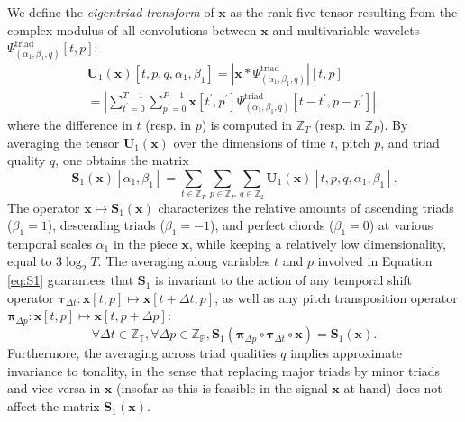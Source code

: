 \documentclass{article}
\makeatletter
\def\resp{resp.\@\xspace}
\makeatother
\begin{document}
We define the \emph{eigentriad transform} of $\boldsymbol{x}$ as the rank-five tensor resulting from the complex modulus of all convolutions between $\boldsymbol{x}$ and multivariable wavelets $\Psi_{(\alpha_1,\beta_1,q)}^{\mathrm{triad}}[t,p]$:
\begin{multline}
\mathbf{U}_1(\boldsymbol{x})[t,p,q,\alpha_1,\beta_1] =
\left \vert \boldsymbol{x} \ast \Psi_{(\alpha_1,\beta_1,q)}^{\mathrm{triad}} \right \vert [t,p] \\
= \left \vert \sum_{t^\prime = 0}^{T-1} \sum_{p^\prime = 0}^{P-1} \boldsymbol{x}\left[t^\prime,p^\prime\right] \Psi_{(\alpha_1,\beta_1,q)}^{\mathrm{triad}}\left[t-t^\prime,p-p^\prime\right]\right \vert,
\end{multline}
where the difference in $t$ (\resp{} in $p$) is computed in $\mathbb{Z}_{T}$ (\resp{} in $\mathbb{Z}_P$).
By averaging the tensor $\mathbf{U}_1 (\boldsymbol{x})$ over the dimensions of time $t$, pitch $p$, and triad quality $q$, one obtains the matrix
\begin{equation}
\mathbf{S}_1 (\boldsymbol{x})[\alpha_1, \beta_1]
=
\sum_{t\in\mathbb{Z}_T} \sum_{p\in\mathbb{Z}_P} \sum_{q\in\mathbb{Z}_2}
\mathbf{U}_1 (\boldsymbol{x})[t,p,q,\alpha_1,\beta_1]. \label{eq:S1}
\end{equation}
The operator $\boldsymbol{x} \mapsto \mathbf{S}_1 (\boldsymbol{x})$ characterizes the relative amounts of ascending triads ($\beta_1 = 1$), descending triads ($\beta_1 = -1$), and perfect chords ($\beta_1 = 0$) at various temporal scales $\alpha_1$ in the piece $\boldsymbol{x}$, while keeping a relatively low dimensionality, equal to $3\log_2 T$.
The averaging along variables $t$ and $p$ involved in Equation \ref{eq:S1} guarantees that $\mathbf{S}_1$ is invariant to the action of any temporal shift operator $\boldsymbol{\tau}_{\Delta t}:\boldsymbol{x}[t,p] \mapsto \boldsymbol{x}[t+\Delta t,p]$, as well as any pitch transposition operator $\boldsymbol{\pi}_{\Delta p}:\boldsymbol{x}[t,p] \mapsto \boldsymbol{x}[t,p+\Delta p]$:
\begin{equation}
\forall \Delta t \in \mathbb{Z_T},
\forall \Delta p \in \mathbb{Z_P},
\mathbf{S}_1 (\boldsymbol{\pi}_{\Delta p} \circ \boldsymbol{\tau}_{\Delta t} \circ \boldsymbol{x}) = \mathbf{S}_1 (\boldsymbol{x}).
\end{equation}
Furthermore, the averaging across triad qualities $q$ implies approximate invariance to tonality, in the sense that replacing major triads by minor triads and vice versa in $\boldsymbol{x}$ (insofar as this is feasible in the signal $\boldsymbol{x}$ at hand) does not affect the matrix $\mathbf{S}_1(\boldsymbol{x})$.
\end{document}
